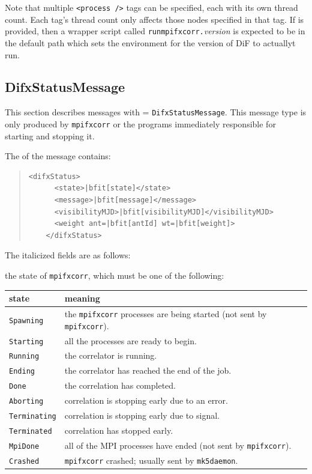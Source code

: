 \begin{description}
Note that multiple {\tt <process />} tags can be specified, each with its own thread count.
Each tag's thread count only affects those nodes specified in that tag.
If {} is provided, then a wrapper script called {\tt runmpifxcorr.}{\em version} is expected to be in the default path which sets the environment for the version of DiF to actuallyt run.






\subsection{DifxStatusMessage}

This section describes messages with  = {\tt DifxStatusMessage}.
This message type is only produced by {\tt mpifxcorr} or the programs immediately responsible for starting and stopping it.

The  of the message contains:

\begin{quotation}
\begin{Verbatim}[commandchars=\|\[\]]
    <difxStatus>
      <state>|bfit[state]</state>
      <message>|bfit[message]</message>
      <visibilityMJD>|bfit[visibilityMJD]</visibilityMJD>
      <weight ant=|bfit[antId] wt=|bfit[weight]>
    </difxStatus>
\end{Verbatim}
\end{quotation}

\noindent The italicized fields are as follows:

\begin{description}
\item{} the state of {\tt mpifxcorr}, which must be one of the following:

\begin{tabular}{ll}
state & meaning \\
\hline
{\tt Spawning} & the {\tt mpifxcorr} processes are being started (not sent by {\tt mpifxcorr}).\\
{\tt Starting} & all the processes are ready to begin. \\
{\tt Running} & the correlator is running. \\
{\tt Ending} & the correlator has reached the end of the job. \\
{\tt Done} & the correlation has completed. \\
{\tt Aborting} & correlation is stopping early due to an error. \\
{\tt Terminating} & correlation is stopping early due to signal. \\
{\tt Terminated} & correlation has stopped early. \\
{\tt MpiDone} & all of the MPI processes have ended (not sent by {\tt mpifxcorr}). \\
{\tt Crashed} & {\tt mpifxcorr} crashed; usually sent by {\tt mk5daemon}.
\end{tabular}


\end{description}
\end{description}
